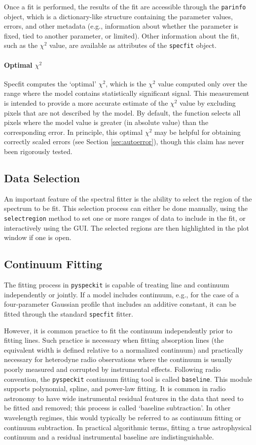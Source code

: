 \documentclass[twocolumn,linenumbers]{aastex63}
\newcommand{\pyspeckit}{\texttt{pyspeckit}\xspace}
\begin{document}
Once a fit is performed, the results of the fit are accessible through the
\texttt{parinfo} object, which is a dictionary-like structure containing
the parameter values, errors, and other metadata (e.g., information about
whether the parameter is fixed, tied to another parameter, or limited).
Other information about the fit, such as the $\chi^2$ value, are available
as attributes of the \texttt{specfit} object.

\paragraph{Optimal $\chi^2$}
Specfit computes the `optimal' $\chi^2$, which is the $\chi^2$
value computed only over the range where the model contains statistically
significant signal.  This measurement is intended to provide a more
accurate estimate of the $\chi^2$ value by excluding pixels that are
not described by the model.  By default, the function selects all pixels where
the model value is greater (in absolute value) than the corresponding error.
In principle, this optimal $\chi^2$ may be helpful for obtaining correctly
scaled errors (see Section \ref{sec:autoerror}), though this claim has never
been rigorously tested.

\subsection{Data Selection}
An important feature of the spectral fitter is the ability to select the region
of the spectrum to be fit.  This selection process can either be done manually,
using the \texttt{selectregion} method to set one or more ranges of data to
include in the fit, or interactively using the GUI.   The selected
regions are then highlighted in the plot window if one is open.

\subsection{Continuum Fitting}
The fitting process in \pyspeckit is capable of treating line and continuum
independently or jointly.  If a model includes continuum, e.g., for the case
of a four-parameter Gaussian profile that includes an additive constant, it
can be fitted through the standard \texttt{specfit} fitter.

However, it is common practice to fit the continuum independently prior to
fitting lines.  Such practice is necessary when fitting absorption lines (the equivalent width is defined relative to a normalized continuum)
and practically necessary for heterodyne radio observations where the
continuum is usually poorly measured and corrupted by instrumental effects.
Following radio convention, the \pyspeckit continuum fitting tool is called
\texttt{baseline}. This module supports polynomial, spline, and power-law
fitting.  It is common in radio astronomy to
have wide instrumental residual features in the data that need to be fitted and
removed; this process is called `baseline subtraction'.  In other wavelength
regimes, this would typically be referred to as continuum fitting or continuum
subtraction.  In practical algorithmic terms, fitting a true astrophysical
continuum and a residual instrumental baseline are indistinguishable.
\end{document}
